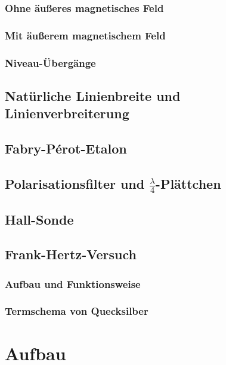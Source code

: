 \subsection{Ohne äußeres magnetisches Feld}

\subsection{Mit äußerem magnetischem Feld}

\subsection{Niveau-Übergänge}

\section{Natürliche Linienbreite und Linienverbreiterung}

\section{Fabry-Pérot-Etalon}

\section{Polarisationsfilter und $\frac{\lambda}4$-Plättchen}

\section{Hall-Sonde}

\section{Frank-Hertz-Versuch}

\subsection{Aufbau und Funktionsweise}

\subsection{Termschema von Quecksilber}

\chapter{Aufbau}

